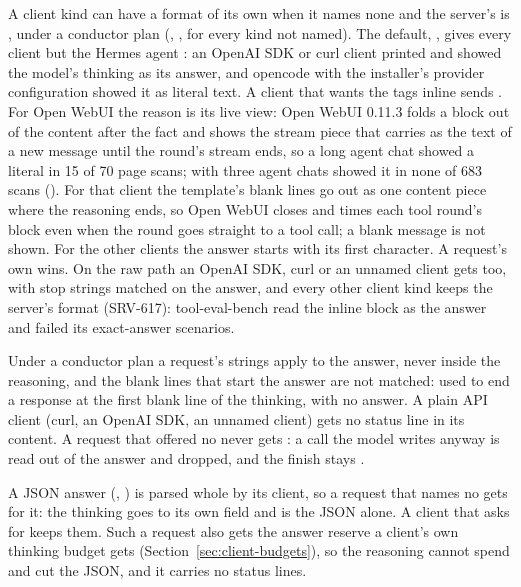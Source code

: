 A client kind can have a format of its own when it names none and the server's is , under a conductor plan (, , \code{*} for every kind not named). The default, , gives every client but the Hermes agent : an OpenAI SDK or curl client printed  and showed the model's thinking as its answer, and opencode with the installer's provider configuration showed it as literal  text. A client that wants the tags inline sends . For Open WebUI the reason is its live view: Open WebUI 0.11.3 folds a  block out of the content after the fact and shows the stream piece that carries  as the text of a new message until the round's stream ends, so a long agent chat showed a literal  in 15 of 70 page scans; with  three agent chats showed it in none of 683 scans (\measured). For that client the template's blank lines go out as one content piece where the reasoning ends, so Open WebUI closes and times each tool round's block even when the round goes straight to a tool call; a blank message is not shown. For the other clients the answer starts with its first character. A request's own  wins. On the raw path an OpenAI SDK, curl or an unnamed client gets  too, with stop strings matched on the answer, and every other client kind keeps the server's format (SRV-617): tool-eval-bench read the inline  block as the answer and failed its exact-answer scenarios.

Under a conductor plan a request's  strings apply to the answer, never inside the reasoning, and the blank lines that start the answer are not matched:  used to end a response at the first blank line of the thinking, with no answer. A plain API client (curl, an OpenAI SDK, an unnamed client) gets no status line in its content. A request that offered no  never gets : a call the model writes anyway is read out of the answer and dropped, and the finish stays .

A JSON answer (, ) is parsed whole by its client, so a request that names no  gets  for it: the thinking goes to its own field and  is the JSON alone. A client that asks for  keeps them. Such a request also gets the answer reserve a client's own thinking budget gets (Section~\ref{sec:client-budgets}), so the reasoning cannot spend  and cut the JSON, and it carries no status lines.

